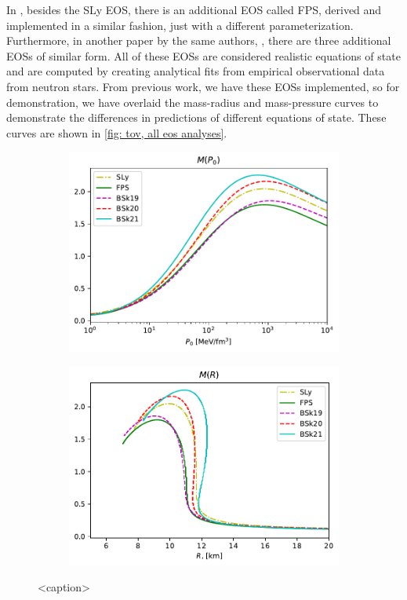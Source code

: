 In \autocite{SLy_2004}, besides the SLy EOS, there is an additional EOS called FPS, derived and implemented in a similar fashion, just with a different parameterization. Furthermore, in another paper by the same authors, \autocite{BSk_2013}, there are three additional EOSs of similar form. All of these EOSs are considered realistic equations of state and are computed by creating analytical fits from empirical observational data from neutron stars. From previous work, we have these EOSs implemented, so for demonstration, we have overlaid the mass-radius and mass-pressure curves to demonstrate the differences in predictions of different equations of state. These curves are shown in \autoref{fig: tov, all eos analyses}.

\begin{figure}[h!]
    \centering
    \begin{subfigure}{.5\textwidth}
        \includegraphics[width=\textwidth]{images/tov/p0_analysis,all.pdf}
    \end{subfigure}%
    \begin{subfigure}{.5\textwidth}
        \includegraphics[width=\textwidth]{images/tov/r_analysis,all.pdf}
    \end{subfigure}
    \caption{<caption>}
    \label{fig: tov, all eos analyses}
\end{figure}
